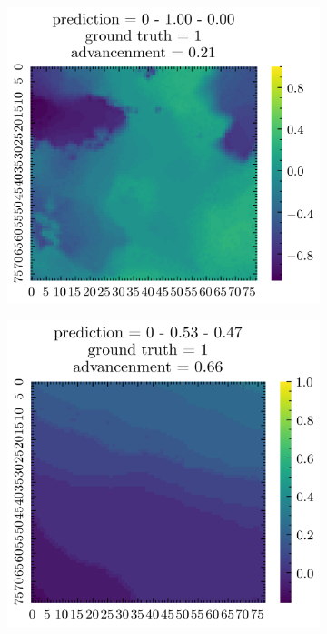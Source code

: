 \begin{figure}[H]
\begin{subfigure}[b]{0.19\textwidth}
    \end{subfigure}  
    \begin{subfigure}[b]{0.19\textwidth}
        \includegraphics[width=\linewidth]{../img/5/quarry/false_positive/patch-2d-2.png}
    \end{subfigure}
    \begin{subfigure}[b]{0.19\textwidth}
        \includegraphics[width=\linewidth]{../img/5/quarry/false_positive/patch-2d-3.png}

\end{subfigure}
\end{figure}
